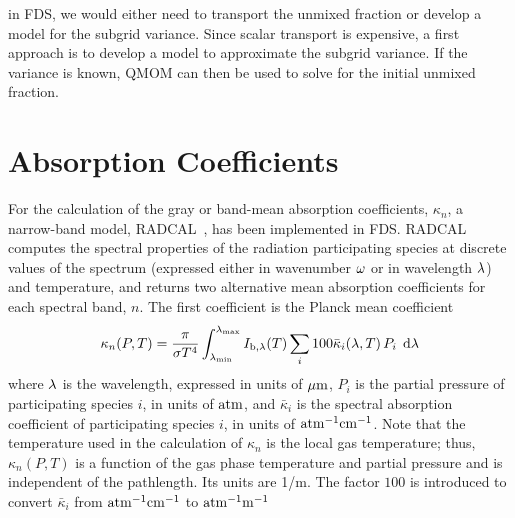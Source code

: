 in FDS, we would either need to transport the unmixed fraction or develop a model for the subgrid variance. Since scalar transport
is expensive, a first approach is to develop a model to approximate the subgrid variance. If the variance is known, QMOM can then
be used to solve for the initial unmixed fraction.


\chapter{Absorption Coefficients}
\label{absorption_coefficients}

For the calculation of the gray or band-mean absorption coefficients, $\kappa_n$, a narrow-band model, RADCAL~\cite{RadCal}, has
been
implemented in FDS. RADCAL computes the spectral properties of the radiation participating species at discrete values of the
spectrum (expressed either in wavenumber $\omega$ or in wavelength $\lambda$) and temperature,
and returns two alternative mean absorption coefficients for each spectral band, $n$. The first coefficient is the Planck mean
coefficient \cite{Tien:1968}
\begin{equation}
\kappa_n(P,T) = \dfrac{\pi}{\sigma T^4}
\displaystyle\int_{\lambda_{\min}}^{\lambda_{\max}}{I_{\rm b,\lambda}(T)
\displaystyle\sum_i 100\bar{\kappa}_i(\lambda,T) \, P_i \; \,\mathrm{d} \lambda}
\end{equation}
where $\lambda$ is the wavelength, expressed in units of ${\rm \mu m}$, $P_i$ is the partial pressure of participating species $i$, in
units of ${\rm atm}$, and $\bar{\kappa}_i$ is the spectral absorption coefficient of participating species $i$, in units of ${\rm
atm^{-1}cm^{-1}}$. Note that the temperature used in the calculation of $\kappa_n$ is the local gas temperature; thus,
$\kappa_n(P,T)$ is a function of the gas phase temperature and partial pressure and is independent of the pathlength. Its units
are 1/m.
The factor $100$ is introduced to convert $\bar{\kappa}_i$ from ${\rm atm^{-1}cm^{-1}}$ to ${\rm atm^{-1}m^{-1}}$

